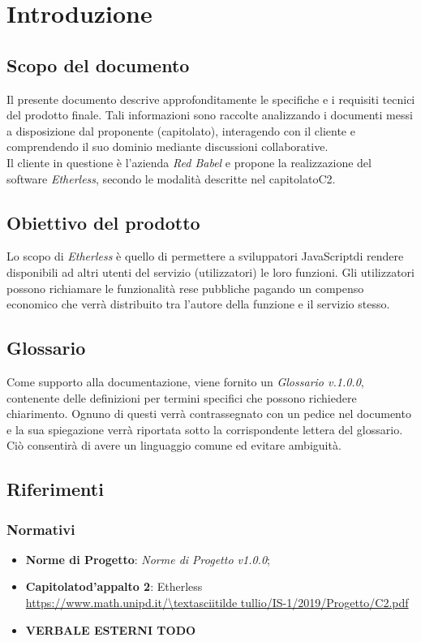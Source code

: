 \section{Introduzione}

\subsection{Scopo del documento}
Il presente documento descrive approfonditamente le specifiche e i requisiti tecnici del prodotto finale. Tali informazioni sono raccolte analizzando i documenti messi a disposizione dal proponente (capitolato\glos), interagendo con il cliente e comprendendo il suo dominio mediante discussioni collaborative.\\
Il cliente in questione è l'azienda \textit{Red Babel} e propone la realizzazione del software \textit{Etherless}, secondo le modalità descritte nel capitolato\glo C2.

\subsection{Obiettivo del prodotto}
Lo scopo di \textit{Etherless} è quello di permettere a sviluppatori JavaScript\glo di rendere disponibili ad altri utenti del servizio (utilizzatori) le loro funzioni. Gli utilizzatori possono richiamare le funzionalità rese pubbliche pagando un compenso economico che verrà distribuito tra l'autore della funzione e il servizio stesso.
	
\subsection{Glossario}
Come supporto alla documentazione, viene fornito un \textit{Glossario v.1.0.0}, contenente delle definizioni per termini specifici che possono richiedere chiarimento. Ognuno di questi verrà contrassegnato con un pedice \glo nel documento e la sua spiegazione verrà riportata sotto la corrispondente lettera del glossario. Ciò consentirà di avere un linguaggio comune ed evitare ambiguità. 
	
\subsection{Riferimenti}
\subsubsection{Normativi}
	\begin{itemize}
		\item \textbf{Norme di Progetto}: \textit{Norme di Progetto v1.0.0};
		\item \textbf{Capitolato\glo d'appalto 2}: Etherless\\ 
			\url{https://www.math.unipd.it/\textasciitilde tullio/IS-1/2019/Progetto/C2.pdf}
		\item \textbf{VERBALE ESTERNI TODO}
	\end{itemize}
